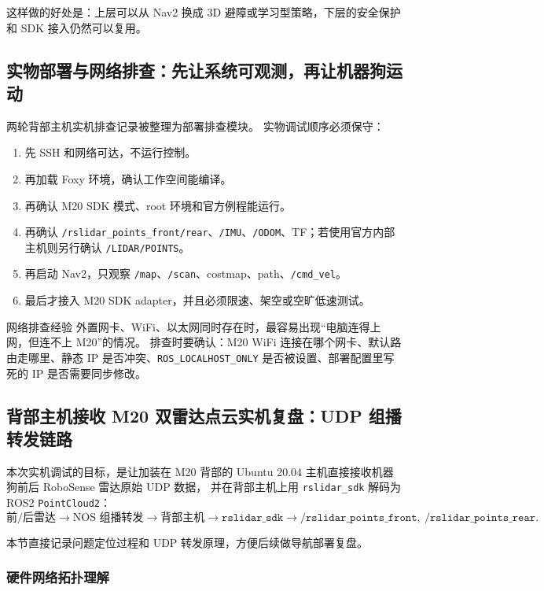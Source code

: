 \documentclass[UTF8,11pt,a4paper]{ctexart}
\begin{document}
这样做的好处是：上层可以从 Nav2 换成 3D 避障或学习型策略，下层的安全保护和 SDK 接入仍然可以复用。

\subsection{实物部署与网络排查：先让系统可观测，再让机器狗运动}

两轮背部主机实机排查记录被整理为部署排查模块。
实物调试顺序必须保守：

\begin{enumerate}
  \item 先 SSH 和网络可达，不运行控制。
  \item 再加载 Foxy 环境，确认工作空间能编译。
  \item 再确认 M20 SDK 模式、root 环境和官方例程能运行。
  \item 再确认 \texttt{/rslidar\_points\_front/rear}、\texttt{/IMU}、\texttt{/ODOM}、TF；若使用官方内部主机则另行确认 \texttt{/LIDAR/POINTS}。
  \item 再启动 Nav2，只观察 \texttt{/map}、\texttt{/scan}、costmap、path、\texttt{/cmd\_vel}。
  \item 最后才接入 M20 SDK adapter，并且必须限速、架空或空旷低速测试。
\end{enumerate}

\begin{redbox}{网络排查经验}
外置网卡、WiFi、以太网同时存在时，最容易出现“电脑连得上网，但连不上 M20”的情况。
排查时要确认：M20 WiFi 连接在哪个网卡、默认路由走哪里、静态 IP 是否冲突、\texttt{ROS\_LOCALHOST\_ONLY} 是否被设置、部署配置里写死的 IP 是否需要同步修改。
\end{redbox}

\subsection{背部主机接收 M20 双雷达点云实机复盘：UDP 组播转发链路}

本次实机调试的目标，是让加装在 M20 背部的 Ubuntu 20.04 主机直接接收机器狗前后 RoboSense 雷达原始 UDP 数据，
并在背部主机上用 \texttt{rslidar\_sdk} 解码为 ROS2 \texttt{PointCloud2}：
\[
\text{前/后雷达}
\rightarrow
\text{NOS 组播转发}
\rightarrow
\text{背部主机}
\rightarrow
\texttt{rslidar\_sdk}
\rightarrow
\texttt{/rslidar\_points\_front},\ \texttt{/rslidar\_points\_rear}.
\]

本节直接记录问题定位过程和 UDP 转发原理，方便后续做导航部署复盘。

\subsubsection{硬件网络拓扑理解}
\end{document}
